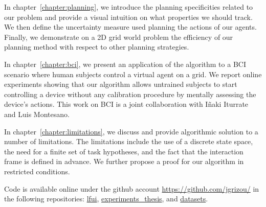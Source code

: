 In chapter~\ref{chapter:planning}, we introduce the planning specificities related to our problem and provide a visual intuition on what properties we should track. We then define the uncertainty measure used planning the actions of our agents. Finally, we demonstrate on a 2D grid world problem the efficiency of our planning method with respect to other planning strategies.

In chapter~\ref{chapter:bci}, we present an application of the algorithm to a BCI scenario where  human subjects control a virtual agent on a grid. We report online experiments showing that our algorithm allows untrained subjects to start controlling a device without any calibration procedure by mentally assessing the device's actions. This work on BCI is a joint collaboration with I{\~n}aki Iturrate and Luis Montesano.

In chapter~\ref{chapter:limitations}, we discuss and provide algorithmic solution to a number of limitations. The limitations include the use of a discrete state space, the need for a finite set of task hypotheses, and the fact that the interaction frame is defined in advance. We further propose a proof for our algorithm in restricted conditions.

Code is available online under the github account \url{https://github.com/jgrizou/} in the following repositories: \href{https://github.com/jgrizou/lfui.git}{lfui}, \href{https://github.com/jgrizou/experiments_thesis.git}{experiments\_thesis}, and \href{https://github.com/jgrizou/datasets.git}{datasets}.
